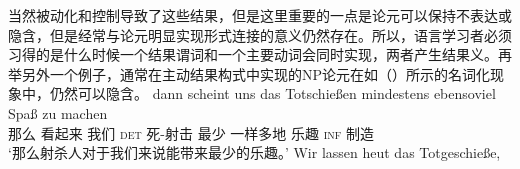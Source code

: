 \begin{exe}
\begin{xlist}[iv.]
\begin{exe}
\begin{xlist}[iv.]
\z
当然被动化和控制导致了这些结果，但是这里重要的一点是论元可以保持不表达或隐含，但是经常与论元明显实现形式连接的意义仍然存在\citep[Section~4]{Mueller2007d}。所以，语言学习者必须习得的是什么时候一个结果谓词和一个主要动词会同时实现，两者产生结果义。再举另外一个例子，通常在主动结果构式中实现的NP论元在如（）所示的名词化现象中，仍然可以隐含。
\eal
\label{ex-tot-schiessen}
\ex 
\gll dann scheint uns das Totschießen mindestens ebensoviel Spaß zu machen\footnotemark\\
     那么 看起来 我们  \textsc{det} 死-射击 最少 一样多地 乐趣 \textsc{inf} 制造\\
\glt `那么射杀人对于我们来说能带来最少的乐趣。'
\ex
\gll Wir lassen heut das Totgeschieße,\\                   

\end{xlist}
\end{exe}
\end{xlist}
\end{exe}
